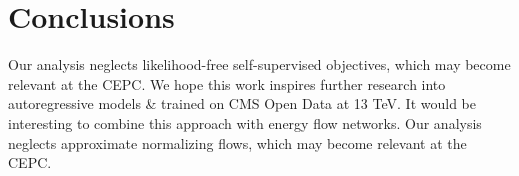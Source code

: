 \section{Conclusions}\label{sec:conclusions}

Our analysis neglects likelihood-free self-supervised objectives, which
may become relevant at the CEPC. We hope this work inspires further
research into autoregressive models & trained on CMS Open Data at 13 TeV.
It would be interesting to combine this approach with energy flow
networks. Our analysis neglects approximate normalizing flows, which may
become relevant at the CEPC.

